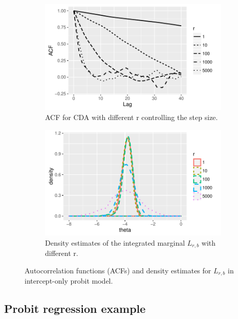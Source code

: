 \documentclass[10pt]{article}
\begin{document}
\begin{figure}[H]
  \begin{subfigure}[b]{0.45\textwidth}
 \includegraphics[width=1\textwidth]{probit_demo_acf.pdf}
  \caption{ACF for CDA with different r controlling the step size.}
 \label{probit_demo_intercept_proposal}
\end{subfigure}
  \hfill
    \begin{subfigure}[b]{0.45\textwidth}
 \includegraphics[width=1\textwidth]{density_probit.pdf}
  \caption{Density estimates of the integrated marginal $L_{r,b}$ with different r.}
   \label{probit_demo_intercept_density}
\end{subfigure}
  \caption{ Autocorrelation functions (ACFs) and density estimates for $L_{r,b}$ in intercept-only probit model.}
 \label{probit_demo_intercept}
 \end{figure}

\subsection{Probit regression example}
\end{document}
